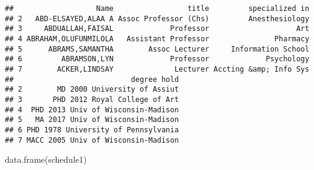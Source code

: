 \documentclass[
]{article}
\newenvironment{Shaded}{\begin{snugshade}}{\end{snugshade}}
\newcommand{\FunctionTok}[1]{\textcolor[rgb]{0.00,0.00,0.00}{#1}}
\newcommand{\NormalTok}[1]{#1}
\begin{document}
\begin{verbatim}
##                   Name                 title         specialized in
## 2   ABD-ELSAYED,ALAA A Assoc Professor (Chs)         Anesthesiology
## 3     ABDUALLAH,FAISAL             Professor                    Art
## 4 ABRAHAM,OLUFUNMILOLA   Assistant Professor               Pharmacy
## 5      ABRAMS,SAMANTHA        Assoc Lecturer     Information School
## 6         ABRAMSON,LYN             Professor             Psychology
## 7        ACKER,LINDSAY              Lecturer Accting &amp; Info Sys
##                           degree hold
## 2        MD 2000 University of Assiut
## 3       PHD 2012 Royal College of Art
## 4  PHD 2013 Univ of Wisconsin-Madison
## 5   MA 2017 Univ of Wisconsin-Madison
## 6 PHD 1978 University of Pennsylvania
## 7 MACC 2005 Univ of Wisconsin-Madison
\end{verbatim}

\begin{Shaded}
\begin{Highlighting}[]
\FunctionTok{data.frame}\NormalTok{(schedule1)}
\end{Highlighting}
\end{Shaded}
\end{document}
